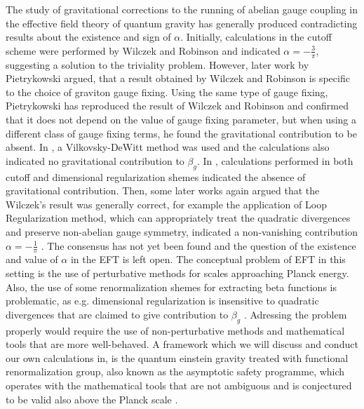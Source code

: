 \documentclass[11pt, a4paper]{article}
\begin{document}
The study of gravitational corrections to the running of abelian gauge coupling in the effective field theory of quantum gravity has generally produced contradicting results about the existence and sign of $\alpha$.
Initially, calculations in the cutoff scheme were performed by Wilczek and Robinson \cite{wilczek} and indicated
$\alpha = - \frac{3}{\pi} $, suggesting a solution to the triviality problem.
However, later work by Pietrykowski \cite{pietrykowski} argued, that a result obtained by Wilczek and Robinson is specific to the choice of graviton gauge fixing.
Using the same type of gauge fixing, Pietrykowski has reproduced the result of Wilczek and Robinson and confirmed that it does not depend on the value of gauge fixing parameter, but when using a different class of gauge fixing terms, he found the gravitational contribution to be absent.
In \cite{toms}, a Vilkovsky-DeWitt method was used and the calculations also indicated no gravitational contribution to $\beta_g$.
In \cite{absence}, calculations performed in both cutoff and dimensional regularization shemes indicated the absence of gravitational contribution.
Then, some later works again argued that the Wilczek's result was generally correct, for example the application of Loop Regularization method, which can appropriately treat the quadratic divergences and preserve non-abelian gauge symmetry,
indicated a non-vanishing contribution $\alpha = -\frac{1}{\pi} $ \cite{tang}.
The consensus has not yet been found and the question of the existence and value of $\alpha$ in the EFT is left open.
The conceptual problem of EFT in this setting is the use of perturbative methods for scales approaching Planck energy.
Also, the use of some renormalization shemes for extracting beta functions is problematic, as e.g. dimensional regularization is insensitive to quadratic
divergences that are claimed to give contribution to $\beta_g$ \cite{absence}.
Adressing the problem properly would require the use of non-perturbative methods and mathematical tools that are more well-behaved.
A framework which we will discuss and conduct our own calculations in, is the quantum einstein gravity treated with functional renormalization group, also known as the asymptotic safety programme, which operates with the mathematical tools that are not ambiguous and
is conjectured to be valid also above the Planck scale \cite{qeg}.


\end{document}
